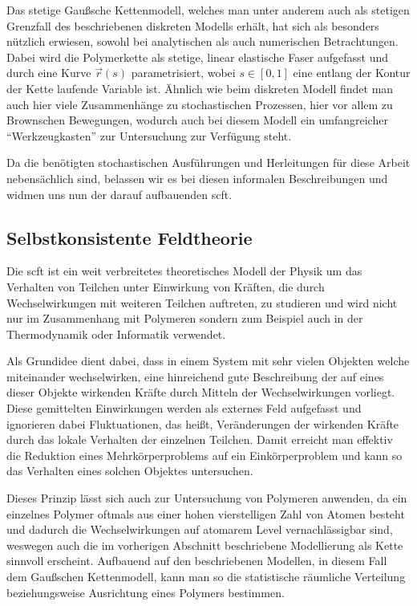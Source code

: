 Das stetige Gaußsche Kettenmodell, welches man unter anderem auch als stetigen Grenzfall des beschriebenen diskreten Modells erhält, hat sich als besonders nützlich erwiesen, sowohl bei analytischen als auch numerischen Betrachtungen.
Dabei wird die Polymerkette als stetige, linear elastische Faser aufgefasst und durch eine Kurve $\vec{r}(s)$ parametrisiert, wobei $s \in [0, 1]$ eine entlang der Kontur der Kette laufende Variable ist.
Ähnlich wie beim diskreten Modell findet man auch hier viele Zusammenhänge zu stochastischen Prozessen, hier vor allem zu Brownschen Bewegungen,
wodurch auch bei diesem Modell ein umfangreicher \enquote{Werkzeugkasten} zur Untersuchung zur Verfügung steht.

Da die benötigten stochastischen Ausführungen und Herleitungen für diese Arbeit nebensächlich sind, belassen wir es bei diesen informalen Beschreibungen und widmen uns nun der darauf aufbauenden \ac{scft}.

\subsection*{Selbstkonsistente Feldtheorie} %
\label{par:self_consistent_field_theory}

Die \acl{scft} ist ein weit verbreitetes theoretisches Modell der Physik um das Verhalten von Teilchen unter Einwirkung von Kräften, die durch Wechselwirkungen mit weiteren Teilchen auftreten, zu studieren und wird nicht nur im Zusammenhang mit Polymeren sondern zum Beispiel auch in der Thermodynamik oder Informatik verwendet.

Als Grundidee dient dabei, dass in einem System mit sehr vielen Objekten welche miteinander wechselwirken, eine hinreichend gute Beschreibung der auf eines dieser Objekte wirkenden Kräfte durch Mitteln der Wechselwirkungen vorliegt.
Diese gemittelten Einwirkungen werden als externes Feld aufgefasst und ignorieren dabei Fluktuationen, das heißt, Veränderungen der wirkenden Kräfte durch das lokale Verhalten der einzelnen Teilchen.
Damit erreicht man effektiv die Reduktion eines Mehrkörperproblems auf ein Einkörperproblem und kann so das Verhalten eines solchen Objektes untersuchen.

Dieses Prinzip lässt sich auch zur Untersuchung von Polymeren anwenden,
da ein einzelnes Polymer oftmals aus einer hohen vierstelligen Zahl von Atomen besteht und dadurch die Wechselwirkungen auf atomarem Level vernachlässigbar sind, weswegen auch die im vorherigen Abschnitt beschriebene Modellierung als Kette sinnvoll erscheint.
Aufbauend auf den beschriebenen Modellen, in diesem Fall dem Gaußschen Kettenmodell, kann man so die statistische räumliche Verteilung beziehungsweise Ausrichtung eines Polymers bestimmen.


